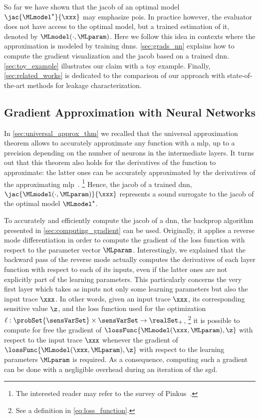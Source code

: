 So far we have shown that the \gls{jacob} of an optimal model \(\jac{\MLmodel^\star}{\xxx}\) may emphasize \glspl{poi}.
In practice however, the evaluator does not have access to the optimal model, but a trained estimation of it, denoted by \(\MLmodel(\cdot, \MLparam)\).
Here we follow this idea in contexts where the approximation is modeled by training \glspl{dnn}.
\autoref{sec:grads_nn} explains how to compute the gradient visualization and the \gls{jacob} based on a trained \gls{dnn}.
\autoref{sec:toy_example} illustrates our claim with a toy example.
Finally, \autoref{sec:related_works} is dedicated to the comparison of our approach with state-of-the-art methods for leakage characterization.


\subsection{Gradient Approximation with Neural Networks}
\label{sec:grads_nn}
In \autoref{sec:universal_approx_thm} we recalled that the universal approximation theorem allows to accurately approximate any function with a \gls{mlp}, up to a precision depending on the number of neurons in the intermediate layers.
It turns out that this theorem also holds for the derivatives of the function to approximate: the latter ones can be accurately approximated by the derivatives of the approximating \gls{mlp}~\cite{hornik_approximation_1991}.%
\footnote{
	The interested reader may refer to the survey of Pinkus~\cite[Sec.~4]{pinkus_approximation_1999}.
}
Hence, the \gls{jacob} of a trained \gls{dnn}, \ie{} \(\jac{\MLmodel(\cdot, \MLparam)}{\xxx}\) represents a sound surrogate to the \gls{jacob} of the optimal model \(\MLmodel^\star\).

To accurately and efficiently compute the \gls{jacob} of a \gls{dnn}, the backprop algorithm presented in \autoref{sec:computing_gradient} can be used.
Originally, it applies a reverse mode differentiation in order to compute the gradient of the loss function with respect to the parameter vector \(\MLparam\).
Interestingly, we explained that the backward pass of the reverse mode actually computes the derivatives of each layer function with respect to each of its inputs, even if the latter ones are not explicitly part of the learning parameters.
This particularly concerns the very first layer which takes as inputs not only some learning parameters but also the input trace \(\xxx\).
In other words, given an input trace \(\xxx\), its corresponding sensitive value \(\z\), and the loss function used for the optimization \(\ell: \probSet{\sensVarSet} \times \sensVarSet \rightarrow \realSet_+\),%
\footnote{
	See a definition in \autoref{eq:loss_function}.
}
it is possible to compute for free the gradient of \(\lossFunc{\MLmodel(\xxx, \MLparam), \z}\) with respect to the input trace \(\xxx\) whenever the gradient of \(\lossFunc{\MLmodel(\xxx, \MLparam), \z}\) with respect to the learning parameters \(\MLparam\) is required.
As a consequence, computing such a gradient can be done with a negligible overhead during an iteration of the \gls{sgd}.


